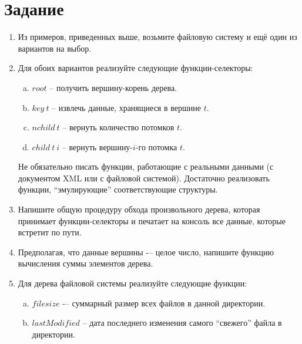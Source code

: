 \documentclass[a4paper,11pt]{article}
\begin{document}
\section{Задание}
\begin{enumerate}
\item Из примеров, приведенных выше, возьмите файловую систему и ещё один из
  вариантов на выбор.
\item Для обоих вариантов реализуйте следующие функции-селекторы:
  \begin{enumerate}[(a)]
  \item $root$ -- получить вершину-корень дерева.
  \item $key~t$ -- извлечь данные, хранящиеся в вершине $t$.
  \item $nchild~t$ -- вернуть количество потомков $t$.
  \item $child~t~i$ -- вернуть вершину-$i$-го потомка $t$.
  \end{enumerate}
  Не обязательно писать функции, работающие с реальными данными (с документом XML
  или с файловой системой). Достаточно реализовать функции, ``эмулирующие''
  соответствующие структуры.
\item Напишите общую процедуру обхода произвольного дерева, которая принимает
  функции-селекторы и печатает на консоль все данные, которые встретит по пути.
\item Предполагая, что данные вершины -– целое число, напишите функцию вычисления
  суммы элементов дерева.
\item Для дерева файловой системы реализуйте следующие функции:
  \begin{enumerate}[(a)]
  \item $filesize$ -– суммарный размер всех файлов в данной директории.
  \item $lastModified$ -- дата последнего изменения самого ``свежего'' файла
    в директории.
  \end{enumerate}
\end{enumerate}
\end{document}
